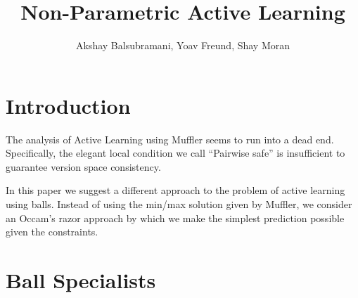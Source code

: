\documentclass{article}
\title{Non-Parametric Active Learning}
\author{Akshay Balsubramani, Yoav Freund, Shay Moran}
\begin{document}
\maketitle
\section{Introduction}

The analysis of Active Learning using Muffler seems to run into a dead
end. Specifically, the elegant local condition we call ``Pairwise
safe'' is insufficient to guarantee version space consistency.

In this paper we suggest a different approach to the problem of active
learning using balls. Instead of using the min/max solution given by
Muffler, we consider an Occam's razor approach by which we make the
simplest prediction possible given the constraints.

\section{Ball Specialists}
\end{document}
